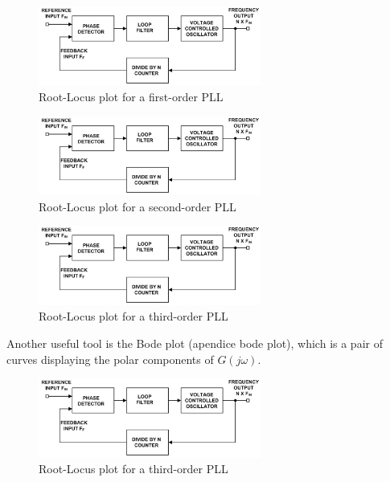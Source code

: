 \begin{figure}[htbp]
    \centering
    \includegraphics[width=0.65\textwidth]{./figures/pll.eps}
    \caption{ Root-Locus plot for a first-order PLL
    \label{fig:rlocus1}}
\end{figure}

\begin{figure}[htbp]
    \centering
    \includegraphics[width=0.65\textwidth]{./figures/pll.eps}
    \caption{ Root-Locus plot for a second-order PLL
    \label{fig:rlocus2}}
\end{figure}

\begin{figure}[htbp]
    \centering
    \includegraphics[width=0.65\textwidth]{./figures/pll.eps}
    \caption{ Root-Locus plot for a third-order PLL
    \label{fig:rlocus3}}
\end{figure}

Another useful tool is the Bode plot (apendice bode plot), which is a pair of
curves displaying the polar components of $G(j\omega)$.

\begin{figure}[htbp]
    \centering
    \includegraphics[width=0.65\textwidth]{./figures/pll.eps}
    \caption{ Root-Locus plot for a third-order PLL
    \label{fig:rlocus3}}
\end{figure}

